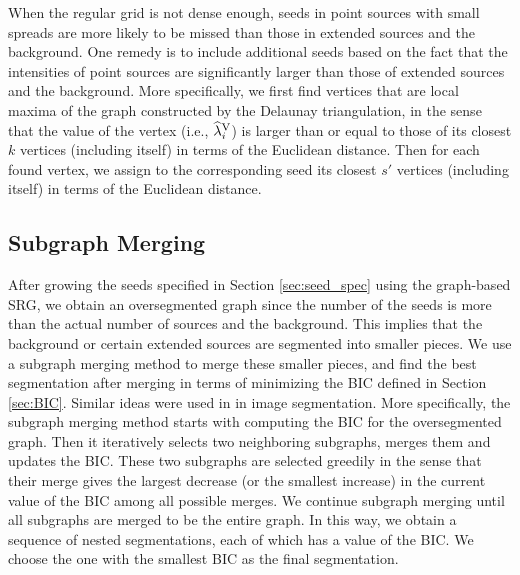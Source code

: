 \documentclass{aastex61}
\begin{document}
When the regular grid is not dense enough, seeds in point sources with small spreads are more likely to be missed than those in extended sources and the background. One remedy is to include additional seeds based on the fact that the intensities of point sources are significantly larger than those of extended sources and the background. More specifically, we first find vertices that are local maxima of the graph constructed by the Delaunay triangulation, in the sense that the value of the vertex (i.e., $\widehat{\lambda}_i^{\rm V}$) is larger than or equal to those of its closest $k$ vertices (including itself) in terms of the Euclidean distance. Then for each found vertex, we assign to the corresponding seed its closest $s'$  vertices (including itself) in terms of the Euclidean distance.

\subsection{Subgraph Merging}
After growing the seeds specified in Section \ref{sec:seed_spec} using the graph-based SRG, we obtain an oversegmented graph since the number of the seeds is more than the actual number of sources and the background. This implies that the background or certain extended sources are segmented into smaller pieces. We use a subgraph merging method to merge these smaller pieces, and find the best segmentation after merging in terms of minimizing the BIC defined in Section \ref{sec:BIC}. Similar ideas were used in \citet{Lee-00, Peng-11} in image segmentation. More specifically, the subgraph merging method starts with computing the BIC for the oversegmented graph. Then it iteratively selects two neighboring subgraphs, merges them and updates the BIC. These two subgraphs are selected greedily in the sense that their merge gives the largest decrease (or the smallest increase) in the current value of the BIC among all possible merges. We continue subgraph merging until all subgraphs are merged to be the entire graph. In this way, we obtain a sequence of nested segmentations, each of which has a value of the BIC. We choose the one with the smallest BIC as the final segmentation.

\newpage




\end{document}
